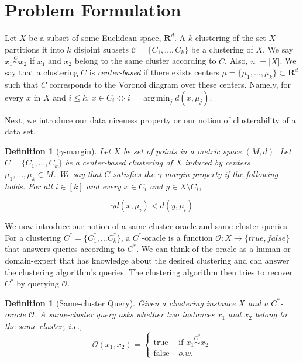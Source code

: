 \documentclass[12pt]{article}
\newcommand{\mc}{\mathcal}
\newcommand{\mb}{\mathbf}
\DeclareMathOperator*{\argmin}{arg\,min}
\newtheorem{definition}[theorem]{Definition}
\begin{document}
\section{Problem Formulation}

Let $X$ be a subset of some Euclidean space, $\mb{R}^d$. A $k$-clustering of the set $X$ partitions it into $k$ disjoint subsets $\mc C = \{C_1, \ldots, C_k\}$ be a clustering  of $X$. We say $x_1 \overset{C}{\sim} x_2$ if $x_1$ and $x_2$ belong to the same cluster according to $C$. Also, $n := |X|$. We say that a clustering $C$ is \emph{center-based} if there exists centers $\mu = \{\mu_1, \ldots, \mu_k\} \subset \mb R^d$ such that $C$ corresponds to the Voronoi diagram over these centers. Namely, for every $x$ in $X$ and $i \leq k$,  $x\in C_i \Leftrightarrow i=\argmin_j d(x,\mu_j)$. 


Next, we introduce our data niceness property or our notion of clusterability of a data set.

\begin{definition}[$\gamma$-margin]
\label{defn:alphacp}
Let $X$ be set of points in a metric space $(M, d)$. Let $C = \{C_1, \ldots, C_k\}$ be a center-based clustering of $X$ induced by centers $\mu_1, \ldots, \mu_k \in M$. We say that $C$ satisfies the $\gamma$-margin property if the following holds. For all $i \in [k]$ and every $x \in C_i$ and $y \in X \setminus C_i$,

$$\gamma d(x, \mu_i) < d(y, \mu_i)$$
\end{definition}


We now introduce our notion of a same-cluster oracle and same-cluster queries. For a clustering $C^*=\{ C^*_1, \ldots C^*_k\}$, a $C^*$-oracle is a function ${\mc O} : X \rightarrow \{true, false\}$ that answers queries according to $C^*$. We can think of the oracle as a human or domain-expert that has knowledge about the desired clustering and can answer the clustering algorithm's queries. The clustering algorithm then tries to recover $C^*$ by querying $\mc O$.

\begin{definition}[Same-cluster Query]
Given a clustering instance $X$ and a $C^*$-oracle $\mc O$. A same-cluster query asks whether two instances $x_1$ and $x_2$ belong to the same cluster, i.e., 
$$\mc O(x_1, x_2) = \left\{
	\begin{array}{ll}
		\mbox{true }  & \mbox{if } x_1 \overset{C^*}{\sim} x_2   \\
		\mbox{false } & o.w. 
	\end{array}
\right. $$
\end{definition}
\end{document}
